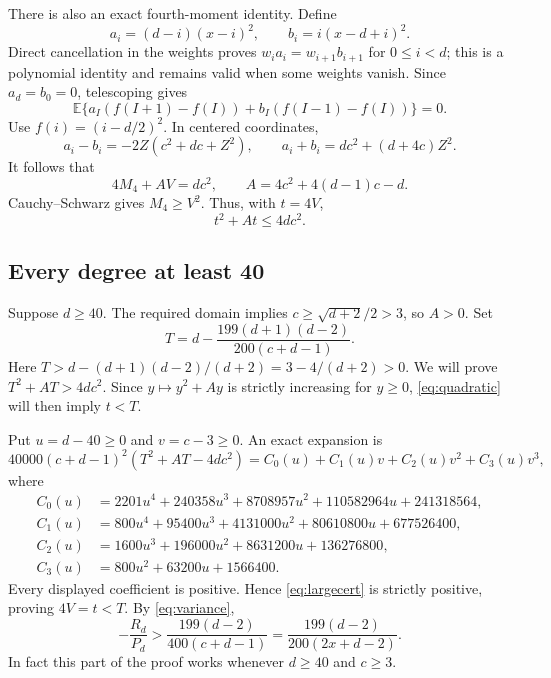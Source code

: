 \documentclass[11pt]{article}
\begin{document}
There is also an exact fourth-moment identity. Define
\[
 a_i=(d-i)(x-i)^2,\qquad b_i=i(x-d+i)^2.
\]
Direct cancellation in the weights proves
$w_i a_i=w_{i+1}b_{i+1}$ for $0\le i<d$; this is a polynomial
identity and remains valid when some weights vanish. Since $a_d=b_0=0$,
telescoping gives
\[
 \mathbb E\{a_I(f(I+1)-f(I))+b_I(f(I-1)-f(I))\}=0.
\]
Use $f(i)=(i-d/2)^2$. In centered coordinates,
\[
 a_i-b_i=-2Z(c^2+dc+Z^2),\qquad
 a_i+b_i=dc^2+(d+4c)Z^2.
\]
It follows that
\begin{equation}\label{eq:moment}
 4M_4+A V=dc^2,\qquad A=4c^2+4(d-1)c-d.
\end{equation}
Cauchy--Schwarz gives $M_4\ge V^2$. Thus, with $t=4V$,
\begin{equation}\label{eq:quadratic}
 t^2+At\le4dc^2.
\end{equation}

\subsection*{Every degree at least 40}
Suppose $d\ge40$. The required domain implies
$c\ge\sqrt{d+2}/2>3$, so $A>0$. Set
\[
 T=d-\frac{199(d+1)(d-2)}{200(c+d-1)}.
\]
Here $T>d-(d+1)(d-2)/(d+2)=3-4/(d+2)>0$.
We will prove $T^2+AT>4dc^2$. Since $y\mapsto y^2+Ay$ is strictly
increasing for $y\ge0$, \eqref{eq:quadratic} will then imply $t<T$.

Put $u=d-40\ge0$ and $v=c-3\ge0$. An exact expansion is
\begin{equation}\label{eq:largecert}
 40000(c+d-1)^2(T^2+AT-4dc^2)
       =C_0(u)+C_1(u)v+C_2(u)v^2+C_3(u)v^3,
\end{equation}
where
\begin{align*}
 C_0(u)&=2201u^4+240358u^3+8708957u^2
                  +110582964u+241318564,\\
 C_1(u)&=800u^4+95400u^3+4131000u^2
                  +80610800u+677526400,\\
 C_2(u)&=1600u^3+196000u^2+8631200u+136276800,\\
 C_3(u)&=800u^2+63200u+1566400.
\end{align*}
Every displayed coefficient is positive. Hence \eqref{eq:largecert}
is strictly positive, proving $4V=t<T$. By \eqref{eq:variance},
\[
 -\frac{R_d}{P_d}>\frac{199(d-2)}{400(c+d-1)}
                =\frac{199(d-2)}{200(2x+d-2)}.
\]
In fact this part of the proof works whenever $d\ge40$ and $c\ge3$.
\end{document}
